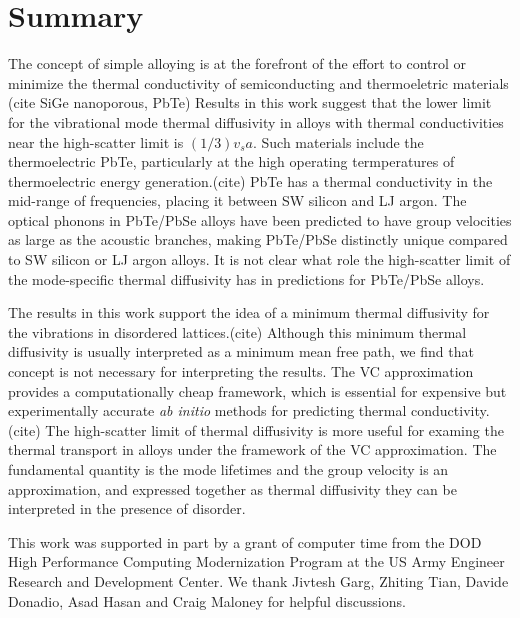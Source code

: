 \documentclass[aps,prb,onecolumn,preprint,superscriptaddress,amsmath,amssymb,floatfix]{revtex4}
\begin{document}
\section{\label{S:Summary}Summary}

The concept of simple alloying is at the forefront of the effort 
to control or minimize the thermal conductivity of semiconducting and 
thermoeletric materials (cite SiGe nanoporous, PbTe) 
Results in this work suggest that the lower limit for the vibrational 
mode thermal diffusivity in alloys with thermal conductivities near the 
high-scatter limit is $(1/3)v_sa$. 
Such materials include the thermoelectric PbTe,
particularly at the high operating termperatures of thermoelectric 
energy generation.(cite) PbTe has a thermal conductivity in the 
mid-range of frequencies, placing it between SW silicon and 
LJ argon. The optical phonons in PbTe/PbSe alloys have been 
predicted to have group velocities 
as large as the acoustic branches, 
making PbTe/PbSe distinctly unique compared 
to SW silicon or LJ argon alloys.
\cite{tian_phonon_2012} 
It is not clear what role the high-scatter limit of the mode-specific 
thermal diffusivity has in predictions for PbTe/PbSe alloys. 

The results in this work support the idea of a minimum thermal diffusivity 
for the vibrations in disordered lattices.(cite) 
Although this minimum thermal 
diffusivity is usually interpreted as a minimum mean free path, we find 
that concept is not necessary for interpreting the results. The VC 
approximation provides a computationally cheap framework, which is 
essential for expensive but experimentally accurate \emph{ab initio} 
methods for predicting thermal conductivity.(cite) 
The high-scatter limit 
of thermal diffusivity is more useful for examing the thermal transport 
in alloys under the framework of the VC approximation. The 
fundamental quantity is the mode lifetimes and the group velocity 
is an approximation, and expressed together as thermal diffusivity 
they can be interpreted in the presence of disorder.

\begin{acknowledgements}
This work was supported in part by a grant of computer time from the DOD 
High Performance Computing Modernization Program at the US Army Engineer 
Research and Development Center. 
We thank Jivtesh Garg, Zhiting Tian, Davide Donadio, 
Asad Hasan and Craig Maloney for helpful discussions.
\end{acknowledgements}
\end{document}
